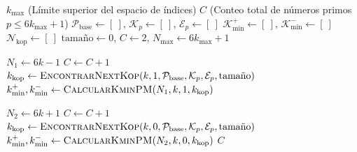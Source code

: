 \documentclass{article}
\numberwithin{equation}{section}
\theoremstyle{plain}
\theoremstyle{definition}
\begin{document}
\begin{algorithm}[htbp]
\caption{Cribado por Proyección Modular con Entrelazamiento $\mathrm{Kmin}^\pm$}
\label{alg:sieve-kmin}
\begin{algorithmic}[1]
\Require $k_{\max}$ (Límite superior del espacio de índices)
\Ensure $C$ (Conteo total de números primos $p \le 6k_{\max}+1$)
\State $\mathcal{P}_{\text{base}} \gets [\ ]$, $\mathcal{K}_p \gets [\ ]$, $\mathcal{E}_p \gets [\ ]$
\State $\mathcal{K}_{\min}^+ \gets [\ ]$, $\mathcal{K}_{\min}^- \gets [\ ]$ 
\State $\mathcal{N}_{\text{kop}} \gets [\ ]$ 
\State $\text{tamaño} \gets 0$, $C \gets 2$, $N_{\max} \gets 6k_{\max} + 1$

    \State $N_1 \gets 6k - 1$ 
        \State $C \gets C + 1$
            \State $k_{\text{kop}} \gets \Call{EncontrarNextKop}{k, 1, \mathcal{P}_{\text{base}}, \mathcal{K}_p, \mathcal{E}_p, \text{tamaño}}$ 
            \State $k_{\min}^+, k_{\min}^- \gets \Call{CalcularKminPM}{N_1, k, 1, k_{\text{kop}}}$
            \State {}
        \EndIf
    \EndIf
    
    \State $N_2 \gets 6k + 1$ 
        \State $C \gets C + 1$
            \State $k_{\text{kop}} \gets \Call{EncontrarNextKop}{k, 0, \mathcal{P}_{\text{base}}, \mathcal{K}_p, \mathcal{E}_p, \text{tamaño}}$ 
            \State $k_{\min}^+, k_{\min}^- \gets \Call{CalcularKminPM}{N_2, k, 0, k_{\text{kop}}}$
            \State {}
        \EndIf
    \EndIf
\EndFor
\State \Return $C$
\end{algorithmic}
\end{algorithm}
\end{document}
